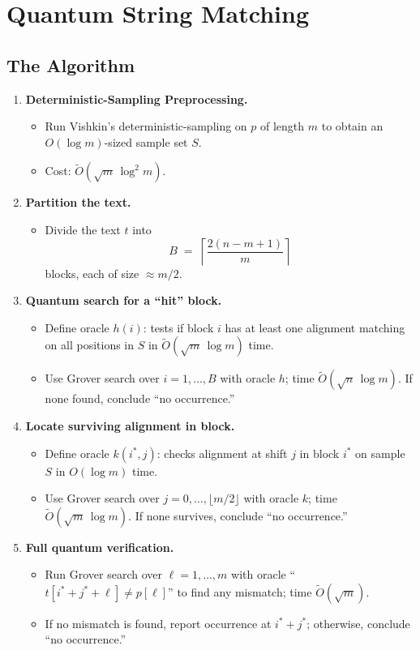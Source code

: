 \documentclass[12pt]{IEEEtran}
\begin{document}
\section{Quantum String Matching}
\subsection{The Algorithm}
\begin{enumerate}
  \item \textbf{Deterministic-Sampling Preprocessing.}
        \begin{itemize}
          \item Run Vishkin's deterministic-sampling on \(p\) of length \(m\) to obtain an \(O(\log m)\)-sized sample set \(S\).
          \item Cost: \(\widetilde O(\sqrt{m}\,\log^2 m)\).
        \end{itemize}
  \item \textbf{Partition the text.}
        \begin{itemize}
          \item Divide the text \(t\) into
                \[
                  B \;=\; \left\lceil \frac{2(n - m + 1)}{m} \right\rceil
                \]
                blocks, each of size \(\approx m/2\).
        \end{itemize}
  \item \textbf{Quantum search for a ``hit'' block.}
        \begin{itemize}
          \item Define oracle \(h(i)\): tests if block \(i\) has at least one alignment matching on all positions in \(S\) in \(\widetilde O(\sqrt{m}\,\log m)\) time.
          \item Use Grover search over \(i=1,\dots,B\) with oracle \(h\); time \(\widetilde O(\sqrt{n}\,\log m)\). If none found, conclude ``no occurrence.''
        \end{itemize}
  \item \textbf{Locate surviving alignment in block.}
        \begin{itemize}
          \item Define oracle \(k(i^*,j)\): checks alignment at shift \(j\) in block \(i^*\) on sample \(S\) in \(O(\log m)\) time.
          \item Use Grover search over \(j=0,\dots,\lfloor m/2\rfloor\) with oracle \(k\); time \(\widetilde O(\sqrt{m}\,\log m)\). If none survives, conclude ``no occurrence.''
        \end{itemize}
  \item \textbf{Full quantum verification.}
        \begin{itemize}
          \item Run Grover search over \(\ell=1,\dots,m\) with oracle ``\(t[i^*+j^*+\ell]\neq p[\ell]\)'' to find any mismatch; time \(\widetilde O(\sqrt{m})\).
          \item If no mismatch is found, report occurrence at \(i^*+j^*\); otherwise, conclude ``no occurrence.''
        \end{itemize}
\end{enumerate}
\end{document}
